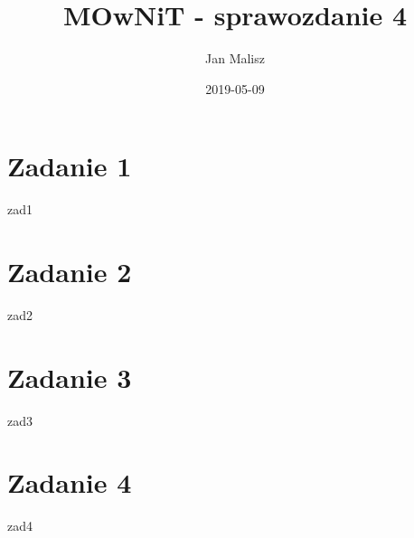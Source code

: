 \documentclass[10pt,a4paper]{article}
\title{MOwNiT - sprawozdanie 4}
\author{Jan Malisz}
\date{2019-05-09}
\begin{document}
  \maketitle
  \thispagestyle{empty}
  \newpage

  \section*{Zadanie 1}\label{sec:Zadanie1}
  {zad1}

  \section*{Zadanie 2}\label{sec:Zadanie2}
  {zad2}

  \section*{Zadanie 3}\label{sec:Zadanie3}
  {zad3}

  \section*{Zadanie 4}\label{sec:Zadanie4}
  {zad4}
\end{document}
